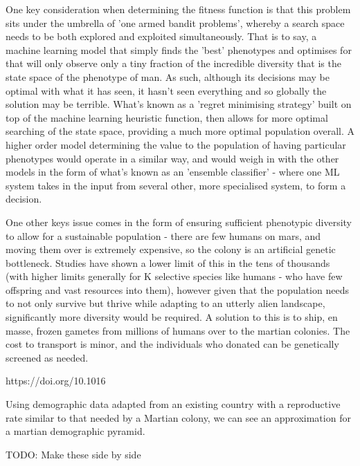 \documentclass[10pt]{article}
\begin{document}
One key consideration when determining the fitness function is that this problem sits under the umbrella of 'one armed bandit problems', whereby a search space needs to be both explored and exploited simultaneously. That is to say, a machine learning model that simply finds the 'best' phenotypes and optimises for that will only observe only a tiny fraction of the incredible diversity that is the state space of the phenotype of man. As such, although its decisions may be optimal with what it has seen, it hasn't seen everything and so globally the solution may be terrible. What's known as a 'regret minimising strategy' built on top of the machine learning heuristic function, then allows for more optimal searching of the state space, providing a much more optimal population overall. A higher order model determining the value to the population of having particular phenotypes would operate in a similar way, and would weigh in with the other models in the form of what's known as an 'ensemble classifier' - where one ML system takes in the input from several other, more specialised system, to form a decision.

One other keys issue comes in the form of ensuring sufficient phenotypic diversity to allow for a sustainable population - there are few humans on mars, and moving them over is extremely expensive, so the colony is an artificial genetic bottleneck. Studies have shown a lower limit of this in the tens of thousands (with higher limits generally for K selective species like humans - who have few offspring and vast resources into them), however given that the population needs to not only survive but thrive while adapting to an utterly alien landscape, significantly more diversity would be required. A solution to this is to ship, en masse, frozen gametes from millions of humans over to the martian colonies. The cost to transport is minor, and the individuals who donated can be genetically screened as needed. 

https://doi.org/10.1016%


Using demographic data adapted from an existing country with a reproductive rate similar to that needed by a Martian colony, we can see an approximation for a martian demographic pyramid.

TODO: Make these side by side

\end{document}
